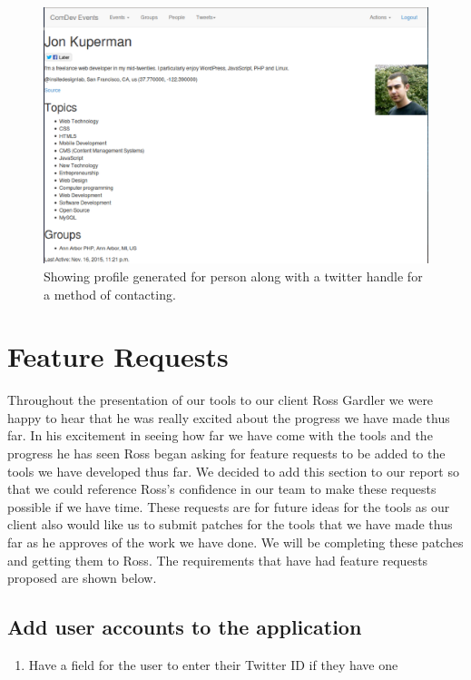 \documentclass[draftclsnofoot,10pt,onecolumn]{IEEEtran} %
\begin{document}
\begin{figure}[H]
  \begin{center}
  
  \includegraphics[width=6in, frame]{peopleProfile}
  \captionsetup{width=.4\linewidth}
  \centering
  \caption{Showing profile generated for person along with a twitter handle for a method of contacting. }

  \end{center}
\end{figure}

\newpage

\section{Feature Requests}
Throughout the presentation of our tools to our client Ross Gardler we were happy to hear that he was really excited about the progress we have made thus far.
In his excitement in seeing how far we have come with the tools and the progress he has seen
Ross began asking for feature requests to be added to the tools we have developed thus far.
We decided to add this section to our report so that we could reference Ross's confidence in our team to make these requests possible if we have time.
These requests are for future ideas for the tools as our client also would like us to submit patches for the tools
that we have made thus far as he approves of the work we have done. We will be completing these patches and getting them to Ross.
The requirements that have had feature requests proposed are shown below.

\subsection{Add user accounts to the application}
\begin{enumerate}
	\item Have a field for the user to enter their Twitter ID if they have one
\end{enumerate}
\end{document}
